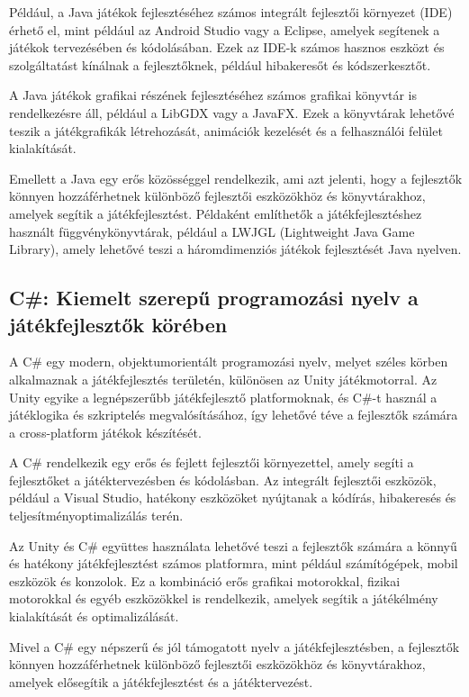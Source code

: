 Például, a Java játékok fejlesztéséhez számos integrált fejlesztői környezet (IDE) érhető el, mint például az Android Studio vagy a Eclipse, amelyek segítenek a játékok tervezésében és kódolásában. Ezek az IDE-k számos hasznos eszközt és szolgáltatást kínálnak a fejlesztőknek, például hibakeresőt és kódszerkesztőt.

A Java játékok grafikai részének fejlesztéséhez számos grafikai könyvtár is rendelkezésre áll, például a LibGDX vagy a JavaFX. Ezek a könyvtárak lehetővé teszik a játékgrafikák létrehozását, animációk kezelését és a felhasználói felület kialakítását.

Emellett a Java egy erős közösséggel rendelkezik, ami azt jelenti, hogy a fejlesztők könnyen hozzáférhetnek különböző fejlesztői eszközökhöz és könyvtárakhoz, amelyek segítik a játékfejlesztést. Példaként említhetők a játékfejlesztéshez használt függvénykönyvtárak, például a LWJGL (Lightweight Java Game Library), amely lehetővé teszi a háromdimenziós játékok fejlesztését Java nyelven.
\subsection{C\#: Kiemelt szerepű programozási nyelv a játékfejlesztők körében}\cite{csharp-doc}

A C\# egy modern, objektumorientált programozási nyelv, melyet széles körben alkalmaznak a játékfejlesztés területén, különösen az Unity játékmotorral. Az Unity egyike a legnépszerűbb játékfejlesztő platformoknak, és C\#-t használ a játéklogika és szkriptelés megvalósításához, így lehetővé téve a fejlesztők számára a cross-platform játékok készítését.

A C\# rendelkezik egy erős és fejlett fejlesztői környezettel, amely segíti a fejlesztőket a játéktervezésben és kódolásban. Az integrált fejlesztői eszközök, például a Visual Studio, hatékony eszközöket nyújtanak a kódírás, hibakeresés és teljesítményoptimalizálás terén.

Az Unity és C\# együttes használata lehetővé teszi a fejlesztők számára a könnyű és hatékony játékfejlesztést számos platformra, mint például számítógépek, mobil eszközök és konzolok. Ez a kombináció erős grafikai motorokkal, fizikai motorokkal és egyéb eszközökkel is rendelkezik, amelyek segítik a játékélmény kialakítását és optimalizálását.

Mivel a C\# egy népszerű és jól támogatott nyelv a játékfejlesztésben, a fejlesztők könnyen hozzáférhetnek különböző fejlesztői eszközökhöz és könyvtárakhoz, amelyek elősegítik a játékfejlesztést és a játéktervezést.
